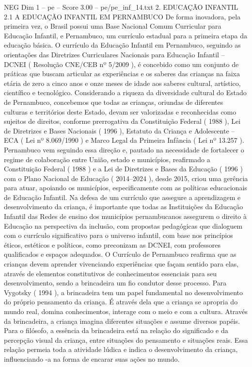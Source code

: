 \begin{textsample}{NEG Dim 1 – pe – Score 3.00 – pe/pe\_inf\_14.txt}  \label{ex:f1_neg_045}
2.
EDUCAÇÃO INFANTIL 2.1 A EDUCAÇÃO INFANTIL EM PERNAMBUCO De forma inovadora, pela primeira vez, o Brasil possui uma Base Nacional Comum Curricular para Educação Infantil, e Pernambuco, um currículo estadual para a primeira etapa da educação básica.
O currículo da Educação Infantil em Pernambuco, seguindo as orientações das Diretrizes Curriculares Nacionais para Educação Infantil – DCNEI ( Resolução CNE/CEB nº 5/2009 ), é concebido como um conjunto de práticas que buscam articular as experiências e os saberes das crianças na faixa etária de zero a cinco anos e onze meses de idade aos saberes cultural, artístico, científico e tecnológico.
Considerando a riqueza da diversidade cultural do Estado de Pernambuco, concebemos que todas as crianças, oriundas de diferentes culturas e territórios deste Estado, devam ser valorizadas e reconhecidas como sujeitos de direitos, conforme prerrogativa da Constituição Federal ( 1988 ), Lei de Diretrizes e Bases Nacionais ( 1996 ), Estatuto da Criança e Adolescente – ECA ( Lei nº 8.069/1990 ) e Marco Legal da Primeira Infância ( Lei nº 13.257 ).
Pernambuco vem seguindo essa direção e, pautado na necessidade de fortalecer o regime de colaboração entre União, estado e municípios, reafirmado a Constituição Federal ( 1988 ) e a Lei de Diretrizes e Bases da Educação ( 1996 ) com o Plano Nacional de Educação ( 2014–2024 ), desde 2015, criou uma gerência para atuar, apoiando os municípios, especificamente com as políticas educacionais de Educação Infantil.
Na defesa de um currículo que assegure a aprendizagem e desenvolvimento da criança, é importante que todas as Instituições da Educação Infantil das Redes de ensino dos municípios pernambucanos assegurem o direito à Educação na perspectiva da inclusão, com propostas pedagógicas que dialoguem com o currículo significativo para o universo infantil, com base nos princípios éticos, estéticos e políticos, como preconizam as DCNEI, com professores qualificados e espaços adequados.
O Currículo de Pernambuco reafirma que as crianças devem aprender vivenciando experiências que façam sentido para elas, através de elementos constitutivos de conhecimentos essenciais para seu desenvolvimento, sendo a brincadeira um fio condutor desse processo.
Para Vygotsky ( 1994 ), a brincadeira tem um papel fundamental no desenvolvimento do próprio pensamento da criança.
É através dela que a criança se apropria do mundo real, domina conhecimentos, interage com o meio e com a cultura.
Através da brincadeira, a criança imagina diferentes situações e assume diversos papéis.
Para o filósofo, a essência da brincadeira está na relação do significado e da percepção visual da criança, entre situações do pensamento e situações reais.
Essa relação permeia toda a atividade lúdica e indica o desenvolvimento da criança, influenciando -a na forma de encarar suas ações no mundo.

\end{textsample}
